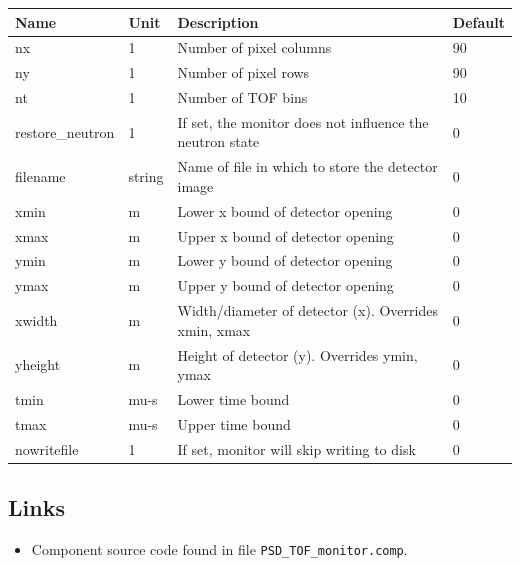 \begin{longtable}{p{}p{}p{}p{}}
\toprule
\textbf{Name} & \textbf{Unit} & \textbf{Description} & \textbf{Default} \\
\midrule
\endhead
nx & 1 & Number of pixel columns & 90 \\
ny & 1 & Number of pixel rows & 90 \\
nt & 1 & Number of TOF bins & 10 \\
restore\_neutron & 1 & If set, the monitor does not influence the neutron state & 0 \\
filename & string & Name of file in which to store the detector image & 0 \\
xmin & m & Lower x bound of detector opening & 0 \\
xmax & m & Upper x bound of detector opening & 0 \\
ymin & m & Lower y bound of detector opening & 0 \\
ymax & m & Upper y bound of detector opening & 0 \\
xwidth & m & Width/diameter of detector (x). Overrides xmin, xmax & 0 \\
yheight & m & Height of detector (y). Overrides ymin, ymax & 0 \\
tmin & mu-s & Lower time bound & 0 \\
tmax & mu-s & Upper time bound & 0 \\
nowritefile & 1 & If set, monitor will skip writing to disk & 0 \\
\bottomrule
\end{longtable}

\subsection*{Links}
\begin{itemize}
  \item Component source code found in file \texttt{PSD\_TOF\_monitor.comp}.
\end{itemize}
